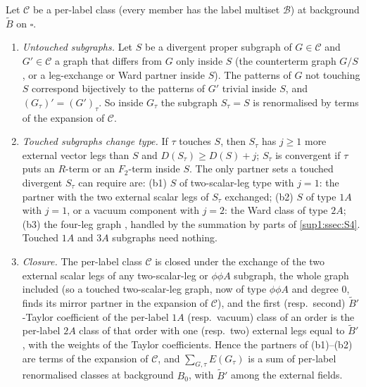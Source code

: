 \begin{lemma}\label{sup3:lem:S144}
Let $\mathcal C$ be a per-label class (every member has the label multiset $\mathcal B$) at background $\tilde B$ on $\square$.
\begin{enumerate}[label=\textup{(\alph*)},nosep,leftmargin=*]
\item \emph{Untouched subgraphs.} Let $S$ be a divergent proper subgraph of $G\in\mathcal C$ and $G'\in\mathcal C$ a graph that differs from $G$ only inside $S$ (the counterterm graph $G/S$, or a leg-exchange or Ward partner inside $S$). The patterns of $G$ not touching $S$ correspond bijectively to the patterns of $G'$ trivial inside $S$, and $(G_\tau)'=(G')_\tau$. So inside $G_\tau$ the subgraph $S_\tau=S$ is renormalised by terms of the expansion of $\mathcal C$.
\item \emph{Touched subgraphs change type.} If $\tau$ touches $S$, then $S_\tau$ has $j\ge1$ more external vector legs than $S$ and $D(S_\tau)\ge D(S)+j$; $S_\tau$ is convergent if $\tau$ puts an $R$-term or an $F_2$-term inside $S$. The only partner sets a touched divergent $S_\tau$ can require are: (b1) $S$ of two-scalar-leg type with $j=1$: the partner with the two external scalar legs of $S_\tau$ exchanged; (b2) $S$ of type $1A$ with $j=1$, or a vacuum component with $j=2$: the Ward class of type $2A$; (b3) the four-leg graph \cite[(2.4)]{Ba3}, handled by the summation by parts of \cref{sup1:ssec:S4}. Touched $1A$ and $3A$ subgraphs need nothing.
\item \emph{Closure.} The per-label class $\mathcal C$ is closed under the exchange of the two external scalar legs of any two-scalar-leg or $\phi\phi A$ subgraph, the whole graph included (so a touched two-scalar-leg graph, now of type $\phi\phi A$ and degree $0$, finds its mirror partner in the expansion of $\mathcal C$), and the first (resp.\ second) $\tilde B'$-Taylor coefficient of the per-label $1A$ (resp.\ vacuum) class of an order is the per-label $2A$ class of that order with one (resp.\ two) external legs equal to $\tilde B'$, with the weights of the Taylor coefficients. Hence the partners of (b1)--(b2) are terms of the expansion of $\mathcal C$, and $\sum_{G,\tau}E(G_\tau)$ is a sum of per-label renormalised classes at background $B_0$, with $\tilde B'$ among the external fields.
\end{enumerate}
\end{lemma}

